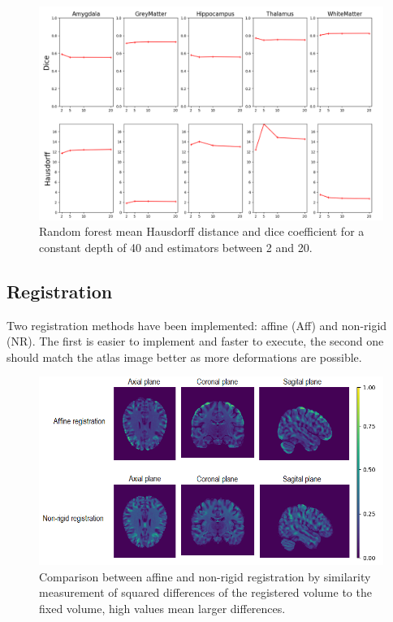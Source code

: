 \begin{figure}[h!]
	\centering
	\includegraphics[width=\linewidth]{img/plotMLOptEstimator2}
	\caption{Random forest mean Hausdorff distance and dice coefficient for a constant depth of 40 and estimators between 2 and 20.}
	\label{fig:MLOptEst}
\end{figure}

\subsection*{Registration}
Two registration methods have been implemented: affine (Aff) and non-rigid (NR). The first is easier to implement and faster to execute, the second one should match the atlas image better as more deformations are possible.

\begin{figure}[h!]
	\centering
	\includegraphics[width=\linewidth]{img/compareRegistration2}
	\caption{Comparison between affine and non-rigid registration by similarity measurement of squared differences of the registered volume to the fixed volume, high values mean larger differences.}
	\label{fig:compareregistration}
\end{figure}

